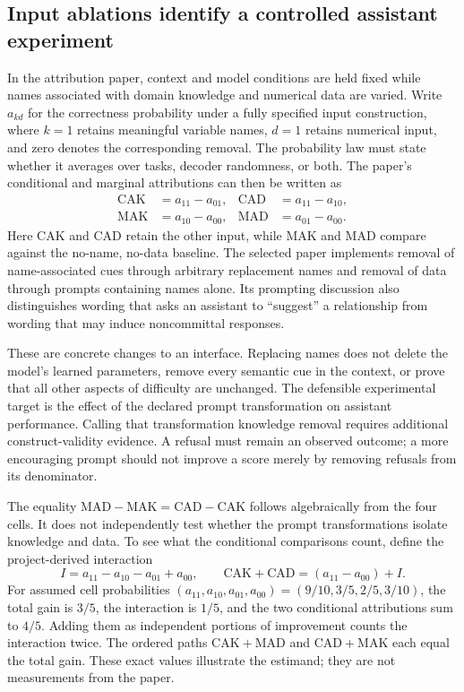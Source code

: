 \subsection{Input ablations identify a controlled assistant experiment}
\label{exec20:pa-attribution}
In the attribution paper, context and model conditions are held fixed while
names associated with domain knowledge and numerical data are varied. Write
$a_{kd}$ for the correctness probability under a fully specified input
construction, where $k=1$ retains meaningful variable names, $d=1$ retains
numerical input, and zero denotes the corresponding removal. The probability
law must state whether it averages over tasks, decoder randomness, or both.
The paper's conditional and marginal attributions can then be written as
\begin{align}
 \mathrm{CAK}&=a_{11}-a_{01}, &
 \mathrm{CAD}&=a_{11}-a_{10}, \nonumber\\
 \mathrm{MAK}&=a_{10}-a_{00}, &
 \mathrm{MAD}&=a_{01}-a_{00}.
 \label{exec20:pa-factorial}
\end{align}
Here CAK and CAD retain the other input, while MAK and MAD compare against
the no-name, no-data baseline. The selected paper implements removal of
name-associated cues through arbitrary replacement names and removal of
data through prompts containing names alone. Its prompting discussion also
distinguishes wording that asks an assistant to ``suggest'' a relationship
from wording that may induce noncommittal responses.
\citep{exec20_attribution}

These are concrete changes to an interface. Replacing names does not delete
the model's learned parameters, remove every semantic cue in the context,
or prove that all other aspects of difficulty are unchanged. The defensible
experimental target is the effect of the declared prompt transformation on
assistant performance. Calling that transformation knowledge removal requires
additional construct-validity evidence. A refusal must remain an observed
outcome; a more encouraging prompt should not improve a score merely by
removing refusals from its denominator.

The equality $\mathrm{MAD}-\mathrm{MAK}=\mathrm{CAD}-\mathrm{CAK}$
follows algebraically from the four cells. It does not independently test
whether the prompt transformations isolate knowledge and data. To see what
the conditional comparisons count, define the project-derived interaction
\begin{equation}
 I=a_{11}-a_{10}-a_{01}+a_{00},\qquad
 \mathrm{CAK}+\mathrm{CAD}=(a_{11}-a_{00})+I.
 \label{exec20:pa-interaction}
\end{equation}
For assumed cell probabilities $(a_{11},a_{10},a_{01},a_{00})=
(9/10,3/5,2/5,3/10)$, the total gain is $3/5$, the interaction is $1/5$,
and the two conditional attributions sum to $4/5$. Adding them as independent
portions of improvement counts the interaction twice. The ordered paths
$\mathrm{CAK}+\mathrm{MAD}$ and $\mathrm{CAD}+\mathrm{MAK}$ each
equal the total gain. These exact values illustrate the estimand; they are
not measurements from the paper.\citep{exec20_population_attribution_reference}


